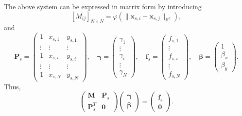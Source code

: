 \documentclass[12pt,a4paper]{article}
\theoremstyle{plain}
\theoremstyle{definition}
\begin{document}
The above system can be expressed in matrix form by introducing 
%
\begin{equation}
\left[M_{ij} \right]_{N \times N}= \varphi \left( \| \mathbf{x}_{s,i} - \mathbf{x}_{s, j} \|_{\mathbb{R}^d} \right),
\end{equation}
%
and
%
\begin{equation} 
\mathbf{P}_s = \begin{pmatrix}
1 & x_{s,1} & y_{s,1} \\ 
\vdots & \vdots & \vdots \\ 
1 & x_{s,i} & y_{s,i} \\ 
\vdots & \vdots & \vdots \\ 
1 & x_{s,N} & y_{s,N}
\end{pmatrix}, \quad 
\mathbf{\gamma} = \begin{pmatrix}
\gamma_1\\ 
\vdots\\ 
\gamma_i\\ 
\vdots\\ 
\gamma_N
\end{pmatrix}, \quad
\mathbf{f}_s = \begin{pmatrix}
f_{s,1}\\ 
\vdots\\ 
f_{s,i}\\ 
\vdots\\ 
f_{s,N}
\end{pmatrix}, \quad
\mathbf{\beta} = \begin{pmatrix}
1\\ 
\beta_x\\  
\beta_y
\end{pmatrix}.
\end{equation} 
%
Thus,
%
\begin{equation} \label{eq:RBFsystem}
\begin{pmatrix}
\mathbf{M} & \mathbf{P}_s \\ 
\mathbf{P}_s^T & \mathbf{0}
\end{pmatrix}
\begin{pmatrix}
\mathbf{\gamma} \\ 
\mathbf{\beta}
\end{pmatrix} =
\begin{pmatrix}
\mathbf{f}_s \\ 
\mathbf{0} 
\end{pmatrix}.
\end{equation}
\end{document}
